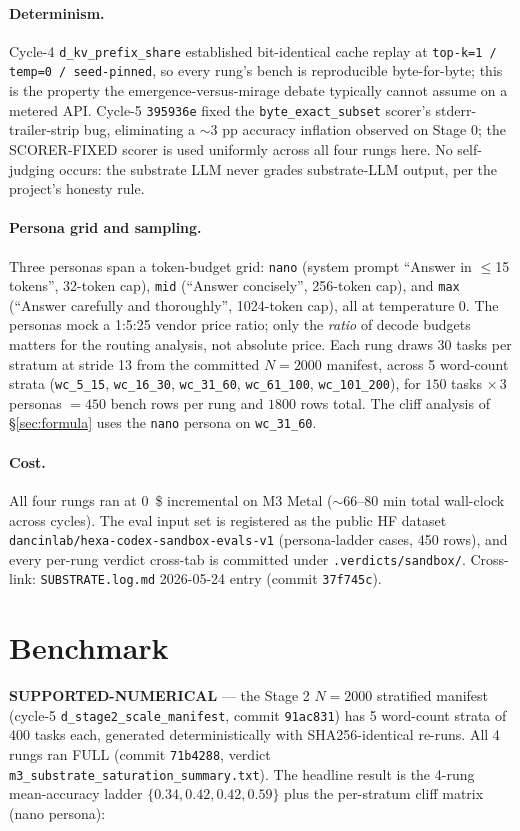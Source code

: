 \documentclass[11pt,a4paper]{article}
\newcommand{\green}[1]{\textcolor{green!50!black}{\textbf{#1}}}
\newcommand{\vfile}[1]{\texttt{.verdicts/sandbox/#1}}
\begin{document}
\paragraph{Determinism.} Cycle-4 \texttt{d\_kv\_prefix\_share} established
bit-identical cache replay at \texttt{top-k=1 / temp=0 / seed-pinned}, so
every rung's bench is reproducible byte-for-byte; this is the property the
emergence-versus-mirage debate \citep{schaeffer2023mirage} typically cannot
assume on a metered API. Cycle-5 \texttt{395936e} fixed the
\texttt{byte\_exact\_subset} scorer's stderr-trailer-strip bug, eliminating a
\(\sim\)3 pp accuracy inflation observed on Stage 0; the SCORER-FIXED scorer
is used uniformly across all four rungs here. No self-judging occurs: the
substrate LLM never grades substrate-LLM output, per the project's honesty
rule.

\paragraph{Persona grid and sampling.} Three personas span a token-budget
grid: \texttt{nano} (system prompt ``Answer in \(\le\)15 tokens'', 32-token
cap), \texttt{mid} (``Answer concisely'', 256-token cap), and \texttt{max}
(``Answer carefully and thoroughly'', 1024-token cap), all at temperature
\(0\). The personas mock a 1:5:25 vendor price ratio; only the \emph{ratio}
of decode budgets matters for the routing analysis, not absolute price. Each
rung draws 30 tasks per stratum at stride 13 from the committed \(N{=}2000\)
manifest, across 5 word-count strata (\texttt{wc\_5\_15}, \texttt{wc\_16\_30},
\texttt{wc\_31\_60}, \texttt{wc\_61\_100}, \texttt{wc\_101\_200}), for
\(150\) tasks \(\times\,3\) personas \(=450\) bench rows per rung and
\(1800\) rows total. The cliff analysis of §\ref{sec:formula} uses the
\texttt{nano} persona on \texttt{wc\_31\_60}.

\paragraph{Cost.} All four rungs ran at \SI{0}{\$} incremental on M3 Metal
(\(\sim\)66--80 min total wall-clock across cycles). The eval input set is
registered as the public HF dataset
\texttt{dancinlab/hexa-codex-sandbox-evals-v1} (persona-ladder cases, 450
rows), and every per-rung verdict cross-tab is committed under
\vfile{}. Cross-link: \texttt{SUBSTRATE.log.md} 2026-05-24 entry (commit
\texttt{37f745c}).

\section{Benchmark}
\label{sec:benchmark}
\green{SUPPORTED-NUMERICAL} --- the Stage 2 \(N{=}2000\) stratified manifest
(cycle-5 \texttt{d\_stage2\_scale\_manifest}, commit \texttt{91ac831}) has 5
word-count strata of 400 tasks each, generated deterministically with
SHA256-identical re-runs. All 4 rungs ran FULL (commit \texttt{71b4288},
verdict \texttt{m3\_substrate\_saturation\_summary.txt}). The headline result
is the 4-rung mean-accuracy ladder \(\{0.34, 0.42, 0.42, 0.59\}\) plus the
per-stratum cliff matrix (nano persona):
\end{document}

